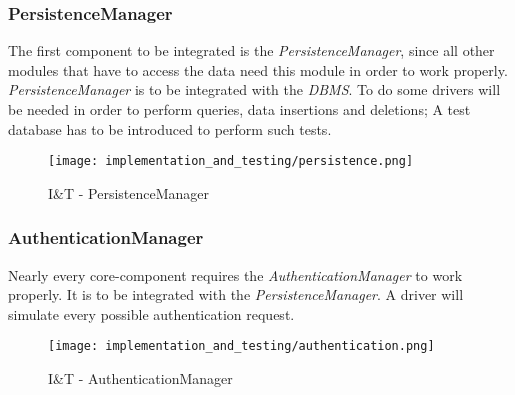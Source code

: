 \subsubsection{PersistenceManager}
The first component to be integrated is the \textit{PersistenceManager}, since all other modules that have to access the data need this module in order to work properly. \textit{PersistenceManager} is to be integrated with the \textit{DBMS}. To do some drivers will be needed in order to perform queries, data insertions and deletions; A test database has to be introduced to perform such tests.
\begin{figure}[H]
	\begin{center}
		\texttt{[image: implementation\_and\_testing/persistence.png]}
	\end{center}
	\caption{I\&T - PersistenceManager}
\end{figure}

\subsubsection{AuthenticationManager}
Nearly every core-component requires the \textit{AuthenticationManager} to work properly. It is to be integrated with the \textit{PersistenceManager}. A driver will simulate every possible authentication request.
\begin{figure}[H]
	\begin{center}
		\texttt{[image: implementation\_and\_testing/authentication.png]}
	\end{center}
	\caption{I\&T - AuthenticationManager}
\end{figure}

